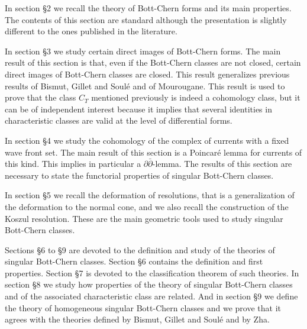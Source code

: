 \documentclass[10pt,twoside]{article}
\numberwithin{equation}{section}
\theoremstyle{plain}
\theoremstyle{definition}
\begin{document}
In section \S 2 we recall the theory of Bott-Chern forms and its
main properties. The contents of this section are standard although
the presentation is slightly different to the ones published in the
literature. 

In section \S 3 we study certain direct images of Bott-Chern forms. The
main result of this section is that, even if the Bott-Chern classes are not
closed, certain direct images of Bott-Chern classes are closed. This
result generalizes previous 
results of Bismut, Gillet and Soul\'e and of Mourougane. This result
is used to prove that the class $C_{T}$ mentioned previously is indeed a
cohomology class, but it can be of independent interest because it
implies that several identities in characteristic classes are valid at
the level of differential forms.

In section \S 4 we study the cohomology of the complex of currents with
a fixed wave front set. The main result of this section is a
Poincar\'e lemma for currents of this kind. This implies in particular
a $\partial\bar \partial$-lemma. The results of this section are
necessary to state the functorial properties of singular Bott-Chern
classes.     

In section \S 5 we recall the deformation of resolutions, that is a
generalization of the deformation to the normal cone, and we also recall
the construction of the Koszul resolution. These are the main
geometric tools used to study singular Bott-Chern classes. 

Sections \S 6 to \S 9 are devoted to the definition and study of the
theories of singular Bott-Chern classes. Section \S 6 contains the
definition and first properties. Section \S 7 is devoted to the
classification theorem of such theories. In section \S 8 we study how
properties of the theory of singular Bott-Chern classes and of the
associated characteristic class are related. And in section \S 9 we
define the theory of homogeneous singular Bott-Chern classes and we
prove that it agrees with the theories defined by Bismut, Gillet and 
Soul\'e and by Zha.   
\end{document}
